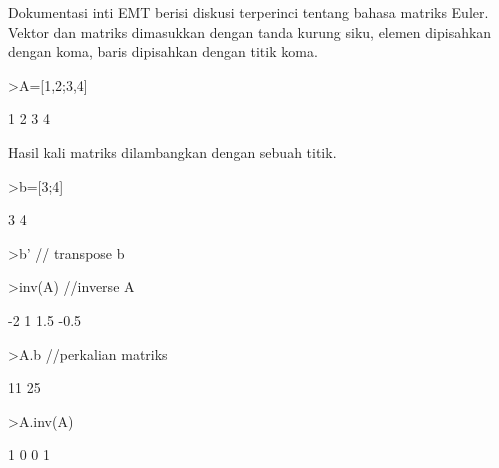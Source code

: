 \documentclass[a4paper,10pt]{article}
\begin{document}
\begin{eulernotebook}
\begin{eulercomment}
\begin{eulercomment}
\begin{eulercomment}
\begin{eulercomment}
\begin{euleroutput}
\end{euleroutput}
\begin{eulercomment}
Dokumentasi inti EMT berisi diskusi terperinci tentang bahasa matriks
Euler.\\
Vektor dan matriks dimasukkan dengan tanda kurung siku, elemen
dipisahkan dengan koma, baris dipisahkan dengan titik koma.
\end{eulercomment}
\begin{eulerprompt}
>A=[1,2;3,4]
\end{eulerprompt}
\begin{euleroutput}
              1             2 
              3             4 
\end{euleroutput}
\begin{eulercomment}
Hasil kali matriks dilambangkan dengan sebuah titik.
\end{eulercomment}
\begin{eulerprompt}
>b=[3;4]
\end{eulerprompt}
\begin{euleroutput}
              3 
              4 
\end{euleroutput}
\begin{eulerprompt}
>b' // transpose b
\end{eulerprompt}
\begin{euleroutput}
  [3,  4]
\end{euleroutput}
\begin{eulerprompt}
>inv(A) //inverse A
\end{eulerprompt}
\begin{euleroutput}
             -2             1 
            1.5          -0.5 
\end{euleroutput}
\begin{eulerprompt}
>A.b //perkalian matriks
\end{eulerprompt}
\begin{euleroutput}
             11 
             25 
\end{euleroutput}
\begin{eulerprompt}
>A.inv(A)
\end{eulerprompt}
\begin{euleroutput}
              1             0 
              0             1 
\end{euleroutput}
\begin{eulercomment}

\end{eulercomment}
\end{eulercomment}
\end{eulercomment}
\end{eulercomment}
\end{eulercomment}
\end{eulernotebook}
\end{document}
